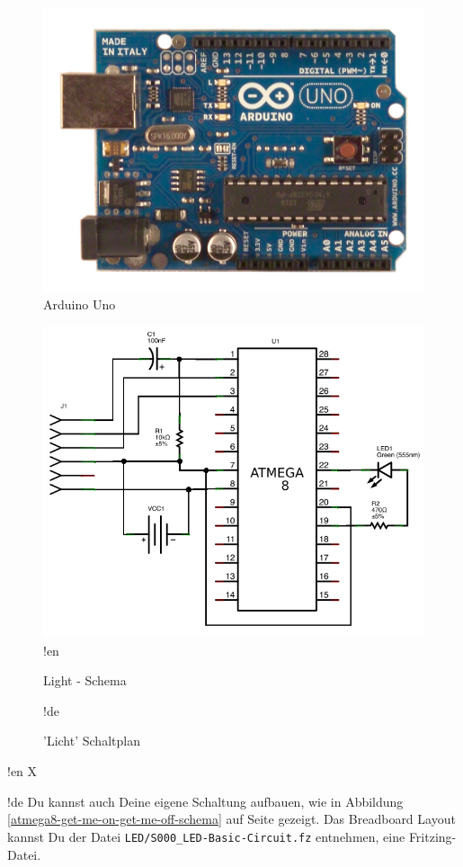 \documentclass[twoside,12pt,authoryear,openright]{book}
\begin{document}
\begin{figure}[htbp]
  \centering
  \includegraphics[width=120mm]{Media/www-arduino-cc_ArduinoUnoFront.jpeg}
  \caption{Arduino Uno}
  \label{ArduinoUnoFront}
\end{figure}


\begin{figure}[htbp]
  \centering
  \includegraphics[width=120mm]{LED/S000_let-there-be-light_Circuit_schema.png}
!en  \caption{Light - Schema}
!de  \caption{'Licht' Schaltplan}
  \label{atmega8-let-there-be-light-schema}
\end{figure}



!en X

!de Du kannst auch Deine eigene Schaltung aufbauen, wie in Abbildung \ref{atmega8-get-me-on-get-me-off-schema} auf Seite \pageref{atmega8-get-me-on-get-me-off-schema} gezeigt. Das Breadboard Layout kannst Du der Datei \texttt{LED/S000\_LED-Basic-Circuit.fz} entnehmen, eine Fritzing-Datei.
\end{document}
